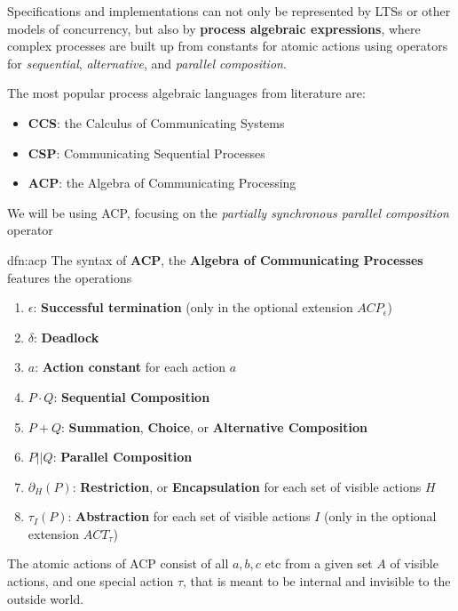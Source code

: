 \documentclass{article}
\begin{document}
Specifications and implementations can not only be represented by LTSs or other models of concurrency, but also by \textbf{process algebraic expressions}, where complex processes are built up from constants for atomic actions using operators for \textit{sequential}, \textit{alternative}, and \textit{parallel composition}.

The most popular process algebraic languages from literature are:
\begin{itemize}
    \item \textbf{CCS}: the Calculus of Communicating Systems
    \item \textbf{CSP}: Communicating Sequential Processes
    \item \textbf{ACP}: the Algebra of Communicating Processing
\end{itemize}

We will be using ACP, focusing on the \textit{partially synchronous parallel composition} operator

\newpage
\begin{dfn}[ACP]{dfn:acp}{}
    The syntax of \textbf{ACP}, the \textbf{Algebra of Communicating Processes} features the operations
    \begin{enumerate}
        \item $\epsilon$: \textbf{Successful termination} (only in the optional extension $ACP_{\epsilon}$)
        \item $\delta$: \textbf{Deadlock}
        \item $a$: \textbf{Action constant} for each action $a$
        \item $P\cdot Q$: \textbf{Sequential Composition}
        \item $P + Q$: \textbf{Summation}, \textbf{Choice}, or \textbf{Alternative Composition}
        \item $P | | Q$: \textbf{Parallel Composition}
        \item $\partial_H(P)$: \textbf{Restriction}, or \textbf{Encapsulation} for each set of visible actions $H$
        \item $\tau_{I}(P)$: \textbf{Abstraction} for each set of visible actions $I$ (only in the optional extension $ACT_{\tau}$)
    \end{enumerate}
\end{dfn}

The atomic actions of ACP consist of all $a,b,c$ etc from a given set $A$ of visible actions, and one special action $\tau$, that is meant to be internal and invisible to the outside world.
\end{document}
